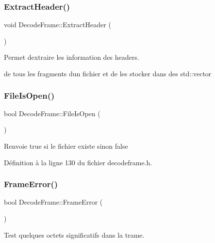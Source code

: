 \subsubsection{\texorpdfstring{Extract\+Header()}{ExtractHeader()}}
{\footnotesize\ttfamily void Decode\+Frame\+::\+Extract\+Header (\begin{DoxyParamCaption}{ }\end{DoxyParamCaption})}



Permet d\textquotesingle{}extraire les information des headers. 

de tous les fragments d\textquotesingle{}un fichier et de les stocker dans des std\+::vector \mbox{\label{class_decode_frame_a5d8e060fc486a29d456973255c88e876}} 
\subsubsection{\texorpdfstring{File\+Is\+Open()}{FileIsOpen()}}
{\footnotesize\ttfamily bool Decode\+Frame\+::\+File\+Is\+Open (\begin{DoxyParamCaption}{ }\end{DoxyParamCaption})\hspace{0.3cm}{\ttfamily [inline]}}

\begin{DoxyReturn}{Renvoie}
true si le fichier existe sinon false 
\end{DoxyReturn}


Définition à la ligne 130 du fichier decodeframe.\+h.

\mbox{\label{class_decode_frame_a177c97af4a097447759fdbd28ef8d18a}} 
\subsubsection{\texorpdfstring{Frame\+Error()}{FrameError()}}
{\footnotesize\ttfamily bool Decode\+Frame\+::\+Frame\+Error (\begin{DoxyParamCaption}{ }\end{DoxyParamCaption})}



Test quelques octets significatifs dans la trame. 

